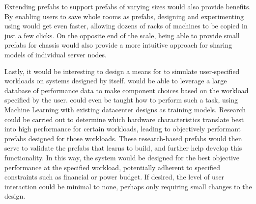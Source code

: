 \documentclass[11pt]{article}
\begin{document}
		Extending prefabs to support prefabs of varying sizes would also provide benefits.
		By enabling users to save whole rooms as prefabs, designing and experimenting using \opendc{} would get even faster, allowing dozens of racks of machines to be copied in just a few clicks.
		On the opposite end of the scale, heing able to provide small prefabs for chassis would also provide a more intuitive approach for sharing models of individual server nodes.

		Lastly, it would be interesting to design a means for \opendc{} to simulate user-specified workloads on systems designed by \opendc{} itself. 
		\opendc{} would be able to leverage a large database of performance data to make component choices based on the workload specified by the user. 
		\opendc{} could even be taught how to perform such a task, using Machine Learning with existing datacenter designs as training models.
		Research could be carried out to determine which hardware characteristics translate best into high performance for certain workloads, leading to objectively performant prefabs designed for those workloads.
		These research-based prefabs would then serve to validate the prefabs that \opendc{} learns to build, and further help develop this functionality.
		In this way, the system would be designed for the best objective performance at the specified workload, potentially adherent to specified constraints such as financial or power budget.
		If desired, the level of user interaction could be minimal to none, perhaps only requiring small changes to the design.







\newpage


\newpage
\appendix
\end{document}
